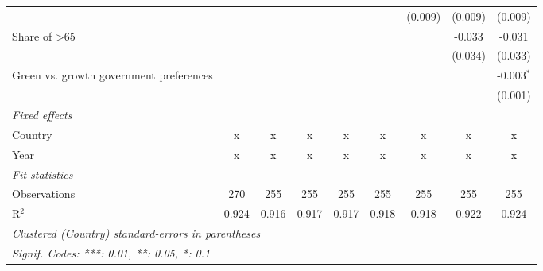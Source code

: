 \begin{table}[htbp]
\begin{tabular}{lcccccccc}
                                                        &         &         &         &         &         & (0.009) & (0.009) & (0.009)\\   
      Share of >65                                      &         &         &         &         &         &         & -0.033  & -0.031\\   
                                                        &         &         &         &         &         &         & (0.034) & (0.033)\\   
      Green vs. growth government preferences           &         &         &         &         &         &         &         & -0.003$^{*}$\\   
                                                        &         &         &         &         &         &         &         & (0.001)\\   
      \emph{Fixed effects}\\
      Country                                           & x       & x       & x       & x       & x       & x       & x       & x\\  
      Year                                              & x       & x       & x       & x       & x       & x       & x       & x\\  
      \midrule \emph{Fit statistics}\\
      Observations                                      & 270     & 255     & 255     & 255     & 255     & 255     & 255     & 255\\  
      R$^2$                                             & 0.924   & 0.916   & 0.917   & 0.917   & 0.918   & 0.918   & 0.922   & 0.924\\  
      \midrule
      \multicolumn{9}{l}{\emph{Clustered (Country) standard-errors in parentheses}}\\
      \multicolumn{9}{l}{\emph{Signif. Codes: ***: 0.01, **: 0.05, *: 0.1}}\\
   \end{tabular}
\end{table}


